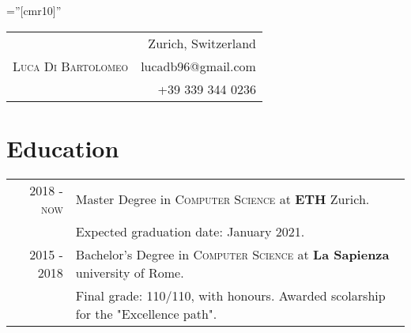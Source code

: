 \documentclass[a4paper,10pt]{article} %
\begin{document}
\pagestyle{empty} %

\font\fb=''[cmr10]'' %

\bigskip
\bigskip


 
\begin{table}[ht]
\begin{center}
\begin{tabular}{cr}
	\multirow{3}{*}{\Huge \textsc{\hspace{2em} Luca Di Bartolomeo  \hspace{2em}}} & Zurich, Switzerland \\
& lucadb96@gmail.com \\
& +39 339 344 0236 \\
\end{tabular}
\end{center}
\end{table}



\section{Education}
\begin{tabular}{rl}
\textsc{2018 - now} & Master Degree in \textsc{Computer Science} at \textbf{ETH} Zurich.\\
&Expected graduation date: January 2021.\\
\textsc{2015 - 2018} & Bachelor's Degree in \textsc{Computer Science} at \textbf{La Sapienza} university of Rome.\\
&Final grade: 110/110, with honours. Awarded scolarship for the "Excellence path".\\
\end{tabular}

\end{document}
